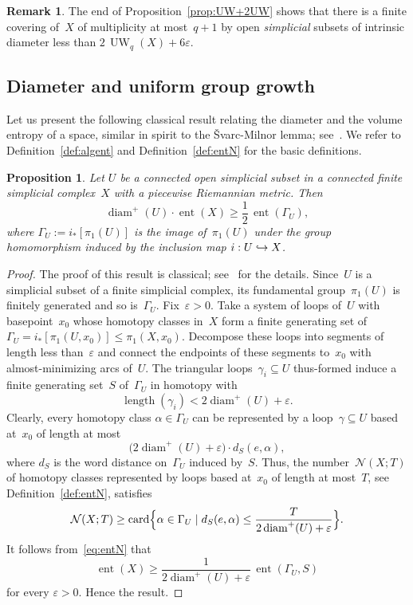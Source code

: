 \documentclass[11pt]{article}
\newcommand\hto{\mathrel{\lhook\joinrel\to}}
\DeclareMathOperator{\card}{card}
\newtheorem{proposition}[theorem]{Proposition}
\theoremstyle{definition}
\newtheorem{remark}[theorem]{Remark}
\DeclareMathOperator\diam{diam}
\DeclareMathOperator{\ent}{ent}\let\eent\ent
\DeclareMathOperator{\length}{length}
\DeclareMathOperator{\UW}{UW}
\numberwithin{equation}{section}
\begin{document}
\begin{remark} \label{rem:UW+2UW}
The end of Proposition~\ref{prop:UW+2UW} shows that there is a finite covering of~$X$ of multiplicity at most~$q+1$ by open \emph{simplicial} subsets of intrinsic diameter less than $2 \, \UW_q(X) + 6 \varepsilon$.
\end{remark}

\subsection{Diameter and uniform group growth}

Let us present the following classical result relating the diameter and the volume entropy of a space, similar in spirit to the \v{S}varc-Milnor lemma; see~\cite[\S5.16]{gro99}.
We refer to Definition~\ref{def:algent} and Definition~\ref{def:entN} for the basic definitions.

\begin{proposition}\label{prop:diam-ent}
Let $U$ be a connected open simplicial subset in a connected finite simplicial complex~$X$ with a piecewise Riemannian metric.
Then
\[
\diam^+(U) \cdot \ent(X) \geq \frac{1}{2} \, \ent(\Gamma_U),
\]
where $\Gamma_U := i_*[\pi_1(U)]$ is the image of~$\pi_1(U)$ under the group homomorphism induced by the inclusion map $i:U \hto X$.
\end{proposition}

\begin{proof}
The proof of this result is classical; see~\cite[Prop.\,3.22]{gro99} for the details.
Since~$U$ is a simplicial subset of a finite simplicial complex, its fundamental group~$\pi_1(U)$ is finitely generated and so is~$\Gamma_U$.
Fix~$\varepsilon >0$.
Take a system of loops of~$U$ with basepoint~$x_0$ whose homotopy classes in~$X$ form a finite generating set of~$\Gamma_U = i_*[\pi_1(U,x_0)] \leqslant \pi_1(X,x_0)$.
Decompose these loops into segments of length less than~$\varepsilon$ and connect the endpoints of these segments to~$x_0$ with almost-minimizing arcs of~$U$.
The triangular loops~$\gamma_ i \subseteq U$ thus-formed induce a finite generating set~$S$ of~$\Gamma_U$ in homotopy with
\[
\length(\gamma_i) < 2 \diam^+(U) + \varepsilon.
\]
Clearly, every homotopy class $\alpha \in \Gamma_U$ can be represented by a loop~$\gamma \subseteq U$ based at~$x_0$ of length at most
\[
\bigl(2 \diam^+(U) + \varepsilon\bigr) \cdot d_S(e,\alpha),
\]
where $d_S$ is the word distance on~$\Gamma_U$ induced by~$S$.
Thus, the number~$\mathcal{N}(X;T)$ of homotopy classes represented by loops based at~$x_0$ of length at most~$T$, see Definition~\ref{def:entN}, satisfies
\[
\mathcal{N}(X;T) \geq \card \Bigl\{\alpha \in\Gamma_U \mid d_S(e,\alpha) \leq \frac{T}{2 \diam^+(U) + \varepsilon} \Bigr\}.
\]
It follows from~\eqref{eq:entN} that
\[
\eent(X) \geq \frac{1}{2 \diam^+(U) + \varepsilon} \, \ent(\Gamma_U,S)
\]
for every $\varepsilon >0$.
Hence the result.
\end{proof}
\end{document}
